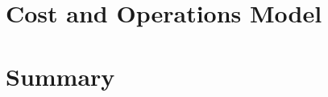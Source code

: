 \section{Cost and Operations Model}
\label{sec:cost-model}



\section{Summary}
\label{sec:design-summary}

